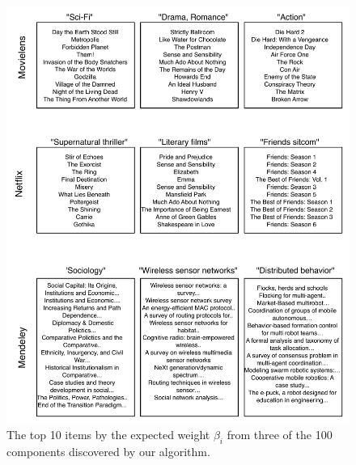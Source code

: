 


\begin{figure}
\centering
\includegraphics[width=\textwidth]{./figures/components.pdf}
\caption{The top 10 items by the expected weight $\beta_i$ from three
  of the 100 components discovered by our algorithm.}
\label{fig:components}
\end{figure}
